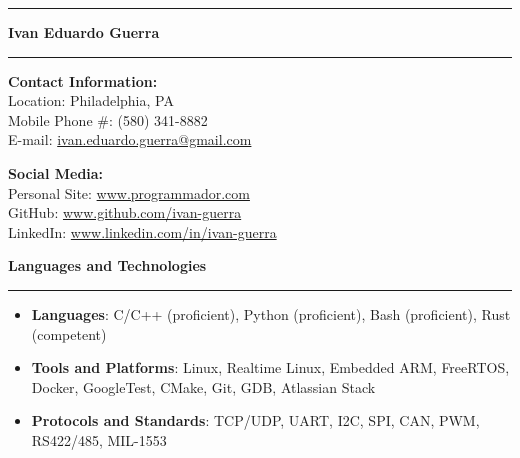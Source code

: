 \documentclass[11pt,letterpaper]{article}
\begin{document}

\hrule
\begin{center}
	\begin{LARGE}
		\textbf{Ivan Eduardo Guerra}
	\end{LARGE}
\end{center}
\hrule

\medskip

\begin{minipage}[t]{0.5\textwidth}
	\begin{flushleft}
		\textbf{Contact Information:}\\
		Location: Philadelphia, PA\\
		Mobile Phone \#: (580) 341-8882\\
		E-mail:
		\href{mailto:ivan.eduardo.guerra@gmail.com}{ivan.eduardo.guerra@gmail.com}
	\end{flushleft}
\end{minipage}
\begin{minipage}[t]{0.46\textwidth}
	\begin{flushright}
		\begin{flushleft}
			\textbf{Social Media:}\\
			Personal Site: \url{www.programmador.com}\\
			GitHub: \url{www.github.com/ivan-guerra}\\
			LinkedIn: \url{www.linkedin.com/in/ivan-guerra}
		\end{flushleft}
	\end{flushright}
\end{minipage}

\bigskip

\begin{large}
	\textbf{Languages and Technologies}
\end{large}

\smallskip \hrule \medskip

\begin{itemize}[topsep=0pt]
	\setlength\itemsep{0.2em}
	\item \textbf{Languages}: C/C++ (proficient),
	      Python (proficient),
	      Bash (proficient),
	      Rust (competent)
	\item \textbf{Tools and Platforms}: 
        Linux,
	      Realtime Linux,
	      Embedded ARM,
	      FreeRTOS,
	      Docker,
	      GoogleTest,
	      CMake,
	      Git,
        GDB,
	      Atlassian Stack
	\item \textbf{Protocols and Standards}: 
	      TCP/UDP,
        UART,
	      I2C,
	      SPI,
	      CAN,
	      PWM,
	      RS422/485,
	      MIL-1553
\end{itemize}
\end{document}
